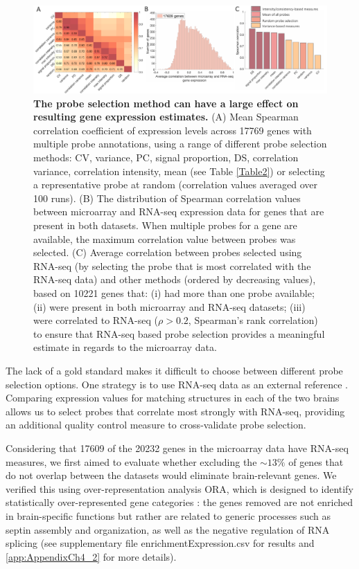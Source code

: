 \begin{figure}[h!]
  \centering
    \includegraphics[width=1\textwidth]{Chapter4/Ch4Fig4.pdf}
\caption{\textbf{The probe selection method can have a large effect on resulting gene expression estimates.}
(A) Mean Spearman correlation coefficient of expression levels across \num{17769} genes with multiple probe annotations, using a range of different probe selection methods: CV, variance, PC, signal proportion, DS, correlation variance, correlation intensity, mean (see Table \ref{Table2}) or selecting a representative probe at random (correlation values averaged over 100 runs).
(B) The distribution of Spearman correlation values between microarray and RNA-seq expression data for genes that are present in both datasets. When multiple probes for a gene are available, the maximum correlation value between probes was selected.
(C) Average correlation between probes selected using RNA-seq (by selecting the probe that is most correlated with the RNA-seq data) and other methods (ordered by decreasing values), based on \num{10221} genes that: (i) had more than one probe available; (ii) were present in both microarray and RNA-seq datasets; (iii) were correlated to RNA-seq ($\rho > 0.2$, Spearman's rank correlation) to ensure that RNA-seq based probe selection provides a meaningful estimate in regards to the microarray data.}
\label{fig:Ch4Fig4}
\end{figure}

The lack of a gold standard makes it difficult to choose between different probe selection options. One strategy is to use RNA-seq data as an external reference \citep{Miller2014a}. Comparing expression values for matching structures in each of the two brains allows us to select probes that correlate most strongly with RNA-seq, providing an additional quality control measure to cross-validate probe selection.

Considering that \num{17609} of the \num{20232} genes in the microarray data have RNA-seq measures, we first aimed to evaluate whether excluding the $\sim13\%$ of genes that do not overlap between the datasets would eliminate brain-relevant genes. We verified this using over-representation analysis ORA, which is designed to identify statistically over-represented gene categories \citep{Gillis2010}: the genes removed are not enriched in brain-specific functions but rather are related to generic processes such as septin assembly and organization, as well as the negative regulation of RNA splicing (see supplementary file enrichmentExpression.csv for results and \ref{app:AppendixCh4_2} for more details).

